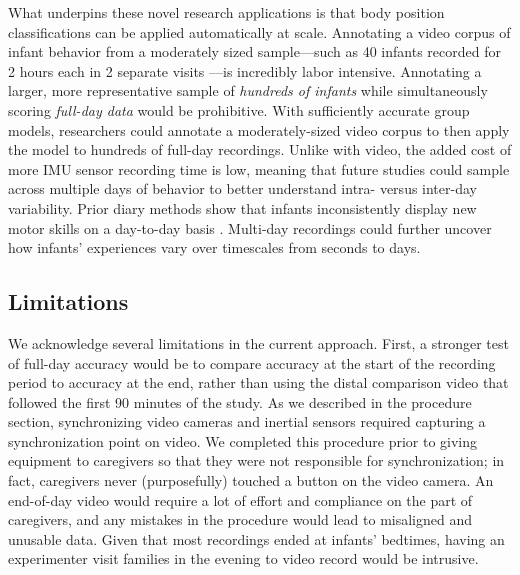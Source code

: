 \documentclass[
  man]{apa6}
\begin{document}
What underpins these novel research applications is that body position classifications can be applied automatically at scale. Annotating a video corpus of infant behavior from a moderately sized sample---such as 40 infants recorded for 2 hours each in 2 separate visits \autocite{HerzbergFletcher2021}---is incredibly labor intensive. Annotating a larger, more representative sample of \emph{hundreds of infants} while simultaneously scoring \emph{full-day data} would be prohibitive. With sufficiently accurate group models, researchers could annotate a moderately-sized video corpus to then apply the model to hundreds of full-day recordings. Unlike with video, the added cost of more IMU sensor recording time is low, meaning that future studies could sample across multiple days of behavior to better understand intra- versus inter-day variability. Prior diary methods show that infants inconsistently display new motor skills on a day-to-day basis \autocite{AdolphRobinson2008,AdolphRobinson2011}. Multi-day recordings could further uncover how infants' experiences vary over timescales from seconds to days.

\hypertarget{limitations}{%
\subsection{Limitations}\label{limitations}}

We acknowledge several limitations in the current approach. First, a stronger test of full-day accuracy would be to compare accuracy at the start of the recording period to accuracy at the end, rather than using the distal comparison video that followed the first 90 minutes of the study. As we described in the procedure section, synchronizing video cameras and inertial sensors required capturing a synchronization point on video. We completed this procedure prior to giving equipment to caregivers so that they were not responsible for synchronization; in fact, caregivers never (purposefully) touched a button on the video camera. An end-of-day video would require a lot of effort and compliance on the part of caregivers, and any mistakes in the procedure would lead to misaligned and unusable data. Given that most recordings ended at infants' bedtimes, having an experimenter visit families in the evening to video record would be intrusive.
\end{document}
